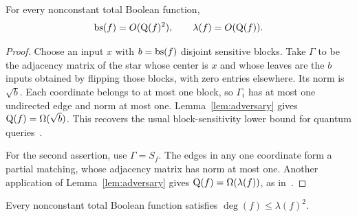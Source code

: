 \begin{lemma}\label{lem:bs-lambda}
For every nonconstant total Boolean function,
\[
 \operatorname{bs}(f)=O(\mathrm Q(f)^2),\qquad
 \lambda(f)=O(\mathrm Q(f)).
\]
\end{lemma}

\begin{proof}
Choose an input $x$ with $b=\operatorname{bs}(f)$ disjoint sensitive blocks. Take
$\Gamma$ to be the adjacency matrix of the star whose center is $x$
and whose leaves are the $b$ inputs obtained by flipping those blocks,
with zero entries elsewhere. Its norm is $\sqrt b$. Each coordinate
belongs to at most one block, so $\Gamma_i$ has at most one undirected
edge and norm at most one. Lemma~\ref{lem:adversary} gives
$\mathrm Q(f)=\Omega(\sqrt b)$. This recovers the usual block-sensitivity
lower bound for quantum queries~\cite{BBCMW01}.

For the second assertion, use $\Gamma=S_f$. The edges in any one
coordinate form a partial matching, whose adjacency matrix has norm
at most one. Another application of Lemma~\ref{lem:adversary} gives
$\mathrm Q(f)=\Omega(\lambda(f))$, as in~\cite{ABKRT21}.
\end{proof}

\begin{lemma}
\label{lem:degree-lambda}
Every nonconstant total Boolean function satisfies
$\deg(f)\le\lambda(f)^2$.
\end{lemma}

